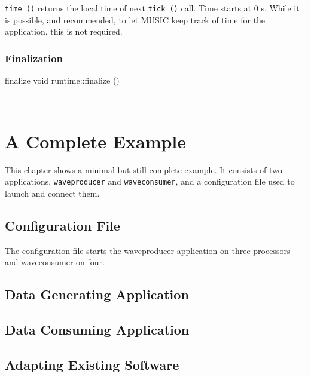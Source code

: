 \documentclass[a4paper]{report}
\makeatletter
\newenvironment{parameters}%
{\begin{tabular}{@{\hspace{2em}}lp{0.6\textwidth}}}%
{\end{tabular}\par\vspace{1mm}\par\hrule\par\vspace{5mm}}
\makeatother
\begin{document}
\lstinline|time ()| returns the local time of next \lstinline|tick ()|
call.  Time starts at 0 s.  While it is possible, and recommended, to
let MUSIC keep track of time for the application, this is not
required.

\subsection{Finalization}

\begin{head}{finalize}
  void runtime::finalize ()
\end{head}
\begin{parameters}
\end{parameters}

\chapter{A Complete Example}

This chapter shows a minimal but still complete example.  It consists
of two applications, \texttt{waveproducer} and \texttt{waveconsumer},
and a configuration file used to launch and connect them.


\section{Configuration File}
\label{sec:conffile}

The configuration file starts the waveproducer application on three
processors and waveconsumer on four.




\section{Data Generating Application}




\section{Data Consuming Application}




\begin{metatext}
\chapter{Adapting Existing Software}
\end{metatext}
\end{document}
